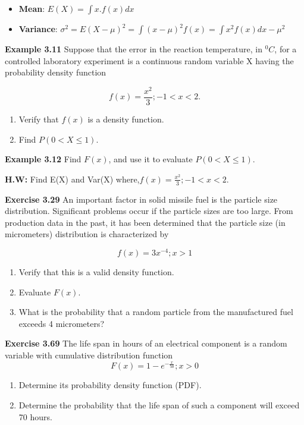 \documentclass[
]{article}
\providecommand{\tightlist}{%
  \setlength{\itemsep}{0pt}\setlength{\parskip}{0pt}}
\begin{document}
\begin{itemize}
\tightlist
\item
  \textbf{Mean}: \(E(X)=\int x.f(x)dx\)
\item
  \textbf{Variance}: \(\sigma^2=E(X-\mu)^2=\int(x-\mu)^2 f(x)=\int x^2 f(x)dx-\mu^2\)
\end{itemize}

\textbf{Example 3.11}\citep{walpole_probability_2017} Suppose that the error in the reaction temperature, in \(^0C\), for a controlled laboratory experiment is a continuous random variable X having the probability density function

\[
f(x)=\frac{x^2}{3}; -1<x<2.
\]

\begin{enumerate}
\def\labelenumi{(\alph{enumi})}
\tightlist
\item
  Verify that \(f(x)\) is a density function.
\item
  Find \(P(0< X \le 1)\).
\end{enumerate}

\textbf{Example 3.12}\citep{walpole_probability_2017} Find \(F(x)\), and use it to evaluate \(P(0 < X\le1)\).

\textbf{H.W:} Find E(X) and Var(X) where,\(f(x)=\frac{x^2}{3}; -1<x<2\).

\textbf{Exercise 3.29}\citep{walpole_probability_2017} An important factor in solid missile fuel is the particle size distribution. Significant problems occur if the particle sizes are too large. From production data in the past, it has been determined that the particle size (in micrometers) distribution is characterized by

\[
f(x)=3x^{-4}; x> 1
\]

\begin{enumerate}
\def\labelenumi{(\alph{enumi})}
\tightlist
\item
  Verify that this is a valid density function.
\item
  Evaluate \(F(x)\).
\item
  What is the probability that a random particle from the manufactured fuel exceeds 4 micrometers?
\end{enumerate}

\textbf{Exercise 3.69}\citep{walpole_probability_2017} The life span in hours of an electrical component is a random variable with cumulative distribution function \[
F(x)=1-e^{-\frac{x}{50}}; x>0
\]

\begin{enumerate}
\def\labelenumi{(\alph{enumi})}
\item
  Determine its probability density function (PDF).
\item
  Determine the probability that the life span of such a component will exceed 70 hours.
\end{enumerate}
\end{document}
